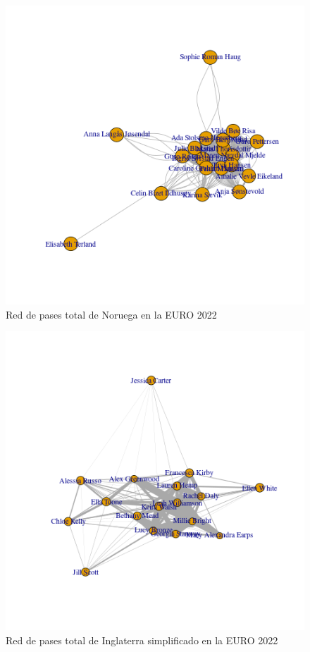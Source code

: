 \begin{figure}[ht!]
    \centering
     \includegraphics[width=\textwidth]{./img/plot_norw.png}
     \caption{Red de pases total de Noruega en la EURO 2022}
     \label{img:red:nor:tot}
\end{figure}

\begin{figure}[ht!]
    \centering
     \includegraphics[width=\textwidth]{./img/plot_england_simpl.png}
     \caption{Red de pases total de Inglaterra simplificado en la EURO 2022}
     \label{img:red:eng}
\end{figure}

